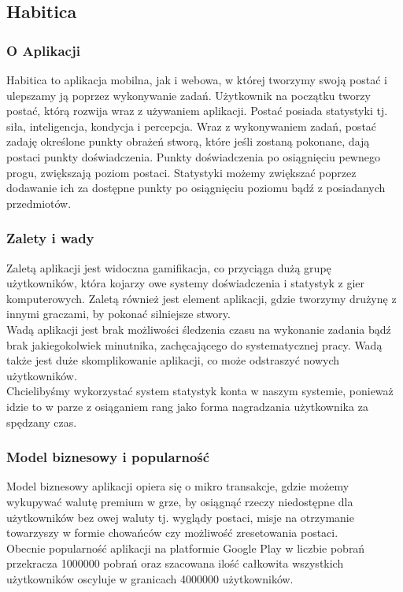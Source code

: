 \documentclass[a4paper,11pt]{report}
\begin{document}
\subsection{Habitica}
\subsubsection{O Aplikacji}
Habitica to aplikacja mobilna, jak i webowa, w której tworzymy swoją postać i ulepszamy ją poprzez wykonywanie zadań.
 Użytkownik na początku tworzy postać, którą rozwija wraz z używaniem aplikacji.
 Postać posiada statystyki tj. siła, inteligencja, kondycja i percepcja.
 Wraz z wykonywaniem zadań, postać zadaję określone punkty obrażeń stworą,
 które jeśli zostaną pokonane, dają postaci punkty doświadczenia.
 Punkty doświadczenia po osiągnięciu pewnego progu, zwiększają poziom postaci.
 Statystyki możemy zwiększać poprzez dodawanie ich za dostępne punkty po osiągnięciu poziomu bądź z posiadanych przedmiotów.
\subsubsection{Zalety i wady}
Zaletą aplikacji jest widoczna gamifikacja, co przyciąga dużą grupę użytkowników,
 która kojarzy owe systemy doświadczenia i statystyk z gier komputerowych.
 Zaletą również jest element aplikacji, gdzie tworzymy drużynę z innymi graczami, by pokonać silniejsze stwory.
\vspace{0,5cm}
\\Wadą aplikacji jest brak możliwości śledzenia czasu na wykonanie zadania bądź brak jakiegokolwiek minutnika, zachęcającego do systematycznej pracy.
 Wadą także jest duże skomplikowanie aplikacji, co może odstraszyć nowych użytkowników.
\vspace{0,5cm}\\
Chcielibyśmy wykorzystać system statystyk konta w naszym systemie,
 ponieważ idzie to w parze z osiąganiem rang jako forma nagradzania użytkownika za spędzany czas.
\subsubsection{Model biznesowy i popularność}
Model biznesowy aplikacji opiera się o mikro transakcje, gdzie możemy wykupywać walutę premium w grze,
 by osiągnąć rzeczy niedostępne dla użytkowników bez owej waluty tj. wyglądy postaci,
 misje na otrzymanie towarzyszy w formie chowańców czy możliwość zresetowania postaci.
\vspace{0,5cm}\\
Obecnie popularność aplikacji na platformie Google Play w liczbie pobrań przekracza 1000000 pobrań
 oraz szacowana ilość całkowita wszystkich użytkowników oscyluje w granicach 4000000 użytkowników.
\end{document}
